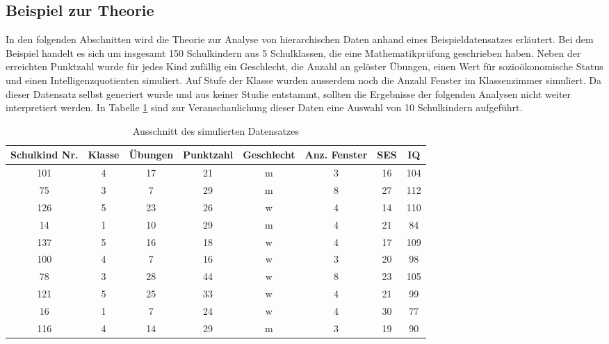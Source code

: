 \documentclass[12pt]{article}\usepackage[]{graphicx}\usepackage[]{color}
\begin{document}
\subsection{Beispiel zur Theorie} \label{section:bsp_theorie}
In den folgenden Abschnitten wird die Theorie zur Analyse von hierarchischen Daten anhand eines Beispieldatensatzes erläutert. Bei dem Beispiel handelt es sich um insgesamt 150 Schulkindern aus 5 Schulklassen, die eine Mathematikprüfung geschrieben haben. Neben der erreichten Punktzahl wurde für jedes Kind zufällig ein Geschlecht, die Anzahl an gelöster Übungen, einen Wert für sozioökonomische Status und einen Intelligenzquotienten simuliert. Auf Stufe der Klasse wurden ausserdem noch die Anzahl Fenster im Klassenzimmer simuliert. Da dieser Datensatz selbst generiert wurde und aus keiner Studie entstammt, sollten die Ergebnisse der folgenden Analysen nicht weiter interpretiert werden. In Tabelle \ref{tab:beispiel_theorie} sind zur Veranschaulichung dieser Daten eine Auswahl von 10 Schulkindern aufgeführt.
\begin{table}[t!]
\centering
\begin{threeparttable}
\caption{Ausschnitt des simulierten Datensatzes} 
\begin{tabular}{cccccccc}
  \toprule
 Schulkind Nr. & Klasse & Übungen & Punktzahl & Geschlecht & Anz. Fenster & SES & IQ \\ 
  \midrule
101 & 4 & 17 & 21 & m & 3 & 16 & 104 \\ 
  75 & 3 & 7 & 29 & m & 8 & 27 & 112 \\ 
  126 & 5 & 23 & 26 & w & 4 & 14 & 110 \\ 
  14 & 1 & 10 & 29 & m & 4 & 21 & 84 \\ 
  137 & 5 & 16 & 18 & w & 4 & 17 & 109 \\ 
  100 & 4 & 7 & 16 & w & 3 & 20 & 98 \\ 
  78 & 3 & 28 & 44 & w & 8 & 23 & 105 \\ 
  121 & 5 & 25 & 33 & w & 4 & 21 & 99 \\ 
  16 & 1 & 7 & 24 & w & 4 & 30 & 77 \\ 
  116 & 4 & 14 & 29 & m & 3 & 19 & 90 \\ 
   \bottomrule
\end{tabular}
\label{tab:beispiel_theorie}
\end{threeparttable}
\end{table}
\end{document}
